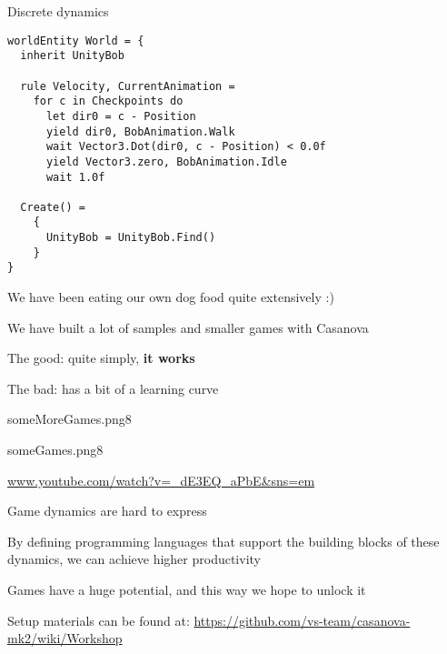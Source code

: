 \documentclass{beamer}
\begin{document}
\begin{frame}[fragile]{Discrete dynamics}
\begin{lstlisting}
worldEntity World = {
  inherit UnityBob

  rule Velocity, CurrentAnimation = 
    for c in Checkpoints do
      let dir0 = c - Position
      yield dir0, BobAnimation.Walk
      wait Vector3.Dot(dir0, c - Position) < 0.0f
      yield Vector3.zero, BobAnimation.Idle
      wait 1.0f

  Create() =
    {
      UnityBob = UnityBob.Find()
    }
}
\end{lstlisting}
\end{frame}

\begin{slide}{
\item We have been eating our own dog food quite extensively :)
\item We have built a lot of samples and smaller games with Casanova
\pause
\item The good: quite simply, \textbf{it works}
\item The bad: has a bit of a learning curve
}\end{slide}

\begin{pictureSlide}
{someMoreGames.png}{8}
\end{pictureSlide}

\begin{picturetextslide}{someGames.png}{8}{
\item \url{www.youtube.com/watch?v=_dE3EQ_aPbE&sns=em}}
\end{picturetextslide}

\begin{slide}{
\item Game dynamics are hard to express
\item By defining programming languages that support the building blocks of these dynamics, we can achieve higher productivity
\item Games have a huge potential, and this way we hope to unlock it
\pause
\item Setup materials can be found at: \url{https://github.com/vs-team/casanova-mk2/wiki/Workshop}
}\end{slide}

\begin{thankyou}
\end{thankyou}
\end{document}
